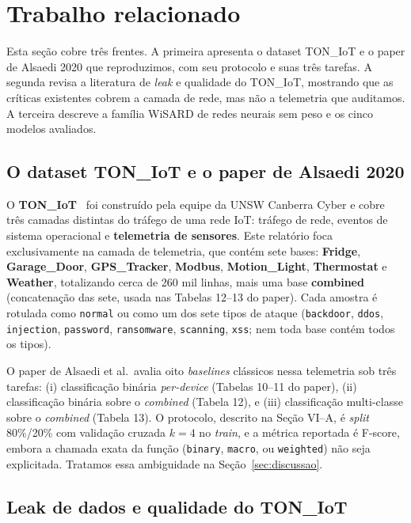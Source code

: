 \section{Trabalho relacionado}
\label{sec:related}

Esta seção cobre três frentes. A primeira apresenta o dataset TON\_IoT e
o paper de Alsaedi 2020 que reproduzimos, com seu protocolo e suas três
tarefas. A segunda revisa a literatura de \emph{leak} e qualidade do
TON\_IoT, mostrando que as críticas existentes cobrem a camada de rede,
mas não a telemetria que auditamos. A terceira descreve a família WiSARD
de redes neurais sem peso e os cinco modelos avaliados.

\subsection{O dataset TON\_IoT e o paper de Alsaedi 2020}

O \textbf{TON\_IoT}~\cite{alsaedi2020toniot,moustafa2021toniot} foi
construído pela equipe da UNSW Canberra Cyber e cobre três camadas
distintas do tráfego de uma rede IoT: tráfego de rede, eventos de
sistema operacional e \textbf{telemetria de sensores}. Este relatório
foca exclusivamente na camada de telemetria, que contém sete bases:
\textbf{Fridge}, \textbf{Garage\_Door}, \textbf{GPS\_Tracker},
\textbf{Modbus}, \textbf{Motion\_Light}, \textbf{Thermostat} e
\textbf{Weather}, totalizando cerca de 260 mil linhas, mais uma base
\textbf{combined} (concatenação das sete, usada nas Tabelas 12--13 do
paper). Cada amostra é rotulada como \texttt{normal} ou como um dos
sete tipos de ataque (\texttt{backdoor}, \texttt{ddos},
\texttt{injection}, \texttt{password}, \texttt{ransomware},
\texttt{scanning}, \texttt{xss}; nem toda base contém todos os tipos).

O paper de Alsaedi et al.\ avalia oito \emph{baselines} clássicos
nessa telemetria sob três tarefas: (i) classificação binária
\emph{per-device} (Tabelas 10--11 do paper), (ii) classificação binária
sobre o \emph{combined} (Tabela 12), e (iii) classificação
multi-classe sobre o \emph{combined} (Tabela 13). O protocolo,
descrito na Seção VI--A, é \emph{split} 80\%/20\% com validação
cruzada $k=4$ no \emph{train}, e a métrica reportada é F-score, embora
a chamada exata da função (\texttt{binary}, \texttt{macro}, ou
\texttt{weighted}) não seja explicitada. Tratamos essa ambiguidade na
Seção~\ref{sec:discussao}.

\subsection{Leak de dados e qualidade do TON\_IoT}
\label{sec:related_leak}

